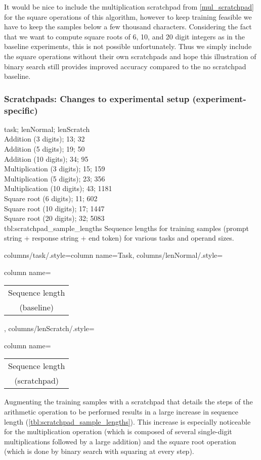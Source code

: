 It would be nice to include the multiplication scratchpad from \cref{mul_scratchpad} for the square operations of this algorithm, however to keep training feasible we have to keep the samples below a few thousand characters. Considering the fact that we want to compute square roots of 6, 10, and 20 digit integers as in the baseline experiments, this is not possible unfortunately.
Thus we simply include the square operations without their own scratchpads and hope this illustration of binary search still provides improved accuracy compared to the no scratchpad baseline.


\subsubsection{Scratchpads: Changes to experimental setup (experiment-specific)}
\label{scratchpad_changes}

{
    task; lenNormal; lenScratch\\
    Addition (3 digits); 13; 32 \\
    Addition (5 digits); 19; 50 \\
    Addition (10 digits); 34; 95 \\
    Multiplication (3 digits); 15; 159 \\
    Multiplication (5 digits); 23; 356 \\
    Multiplication (10 digits); 43; 1181 \\
    Square root (6 digits); 11; 602 \\
    Square root (10 digits); 17; 1447 \\
    Square root (20 digits); 32; 5083 \\
}
{tbl:scratchpad_sample_lengths}
{
    Sequence lengths for training samples (prompt string + response string + end token) for various tasks and operand sizes.
}
{%
    columns/task/.style={column name={Task}},
    columns/lenNormal/.style={column name={\begin{tabular}{c} Sequence length \\ (baseline) \\ \end{tabular}}},
    columns/lenScratch/.style={column name={\begin{tabular}{c} Sequence length \\ (scratchpad) \\ \end{tabular}}}
}

Augmenting the training samples with a scratchpad that details the steps of the arithmetic operation to be performed results in a large increase in sequence length (\cref{tbl:scratchpad_sample_lengths}). This increase is especially noticeable for the multiplication operation (which is composed of several single-digit multiplications followed by a large addition) and the square root operation (which is done by binary search with squaring at every step).

